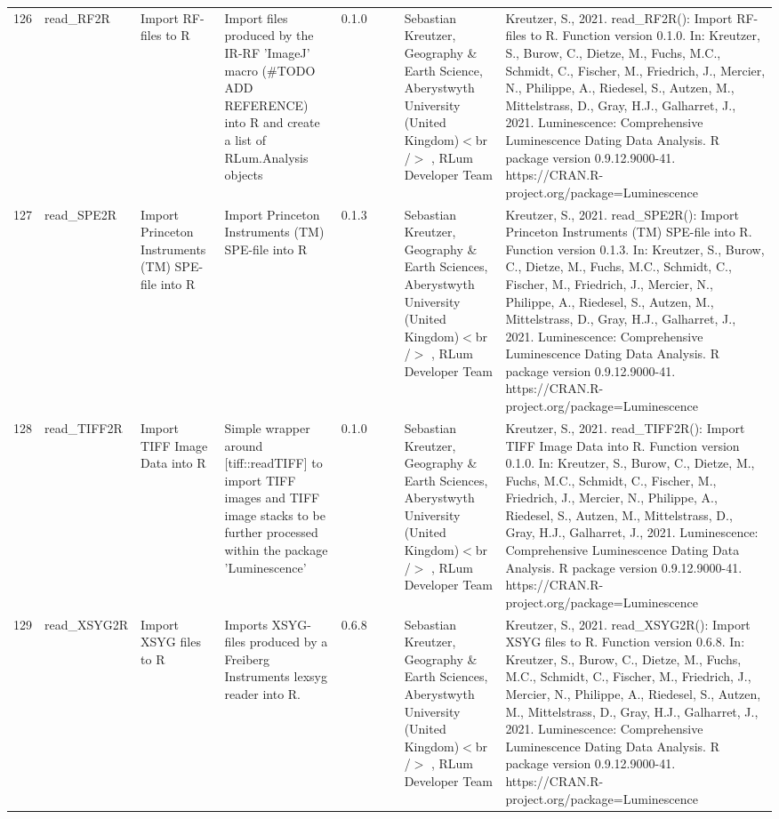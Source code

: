 \begin{table}[ht]
\begin{tabular}{rllllllll}
 \\ 
  126 & read\_RF2R & Import RF-files to R & Import files produced by the IR-RF 'ImageJ' macro (\#TODO ADD REFERENCE) into R and create a list of  RLum.Analysis  objects & 0.1.0
 &  &  & Sebastian Kreutzer, Geography \& Earth Science, Aberystwyth University (United Kingdom)$<$br /$>$ , RLum Developer Team & Kreutzer, S., 2021. read\_RF2R(): Import RF-files to R. Function version 0.1.0. In: Kreutzer, S., Burow, C., Dietze, M., Fuchs, M.C., Schmidt, C., Fischer, M., Friedrich, J., Mercier, N., Philippe, A., Riedesel, S., Autzen, M., Mittelstrass, D., Gray, H.J., Galharret, J., 2021. Luminescence: Comprehensive Luminescence Dating Data Analysis. R package version 0.9.12.9000-41. https://CRAN.R-project.org/package=Luminescence
 \\ 
  127 & read\_SPE2R & Import Princeton Instruments (TM) SPE-file into R & Import Princeton Instruments (TM) SPE-file into R & 0.1.3
 &  &  & Sebastian Kreutzer, Geography \& Earth Sciences, Aberystwyth University (United Kingdom)$<$br /$>$ , RLum Developer Team & Kreutzer, S., 2021. read\_SPE2R(): Import Princeton Instruments (TM) SPE-file into R. Function version 0.1.3. In: Kreutzer, S., Burow, C., Dietze, M., Fuchs, M.C., Schmidt, C., Fischer, M., Friedrich, J., Mercier, N., Philippe, A., Riedesel, S., Autzen, M., Mittelstrass, D., Gray, H.J., Galharret, J., 2021. Luminescence: Comprehensive Luminescence Dating Data Analysis. R package version 0.9.12.9000-41. https://CRAN.R-project.org/package=Luminescence
 \\ 
  128 & read\_TIFF2R & Import TIFF Image Data into R & Simple wrapper around [tiff::readTIFF] to import TIFF images and TIFF image stacks to be further processed within the package 'Luminescence' & 0.1.0
 &  &  & Sebastian Kreutzer, Geography \& Earth Sciences, Aberystwyth University (United Kingdom)$<$br /$>$ , RLum Developer Team & Kreutzer, S., 2021. read\_TIFF2R(): Import TIFF Image Data into R. Function version 0.1.0. In: Kreutzer, S., Burow, C., Dietze, M., Fuchs, M.C., Schmidt, C., Fischer, M., Friedrich, J., Mercier, N., Philippe, A., Riedesel, S., Autzen, M., Mittelstrass, D., Gray, H.J., Galharret, J., 2021. Luminescence: Comprehensive Luminescence Dating Data Analysis. R package version 0.9.12.9000-41. https://CRAN.R-project.org/package=Luminescence
 \\ 
  129 & read\_XSYG2R & Import XSYG files to R & Imports XSYG-files produced by a Freiberg Instruments lexsyg reader into R. & 0.6.8
 &  &  & Sebastian Kreutzer, Geography \& Earth Sciences, Aberystwyth University (United Kingdom)$<$br /$>$ , RLum Developer Team & Kreutzer, S., 2021. read\_XSYG2R(): Import XSYG files to R. Function version 0.6.8. In: Kreutzer, S., Burow, C., Dietze, M., Fuchs, M.C., Schmidt, C., Fischer, M., Friedrich, J., Mercier, N., Philippe, A., Riedesel, S., Autzen, M., Mittelstrass, D., Gray, H.J., Galharret, J., 2021. Luminescence: Comprehensive Luminescence Dating Data Analysis. R package version 0.9.12.9000-41. https://CRAN.R-project.org/package=Luminescence

\end{tabular}
\end{table}
